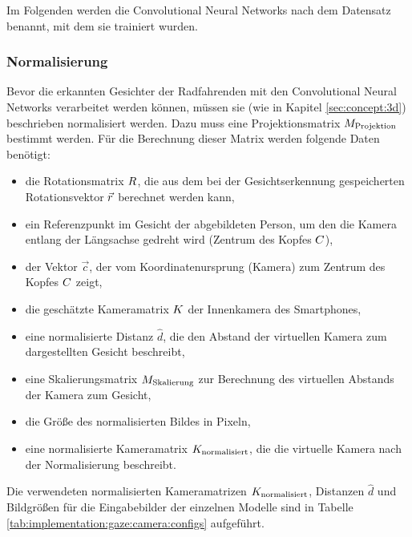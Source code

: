 Im Folgenden werden die Convolutional Neural Networks nach dem Datensatz benannt, mit dem sie trainiert wurden.

\subsubsection{Normalisierung}

Bevor die erkannten Gesichter der Radfahrenden mit den Convolutional Neural Networks verarbeitet werden können, müssen sie (wie in Kapitel \ref{sec:concept:3d}) beschrieben normalisiert werden. Dazu muss eine Projektionsmatrix $M_\text{Projektion}$ bestimmt werden. Für die Berechnung dieser Matrix werden folgende Daten benötigt:

\begin{itemize}
    \item die Rotationsmatrix $R$, die aus dem bei der Gesichtserkennung gespeicherten Rotationsvektor $\vec{r}$ berechnet werden kann,
    \item ein Referenzpunkt im Gesicht der abgebildeten Person, um den die Kamera entlang der Längsachse gedreht wird (Zentrum des Kopfes $C$),
    \item der Vektor $\vec{c}$, der vom Koordinatenursprung (Kamera) zum Zentrum des Kopfes $C$ zeigt,
    \item die geschätzte Kameramatrix $K$ der Innenkamera des Smartphones,
    \item eine normalisierte Distanz $\hat{d}$, die den Abstand der virtuellen Kamera zum dargestellten Gesicht beschreibt,
    \item eine Skalierungsmatrix $M_\text{Skalierung}$ zur Berechnung des virtuellen Abstands der Kamera zum Gesicht,
    \item die Größe des normalisierten Bildes in Pixeln,
    \item eine normalisierte Kameramatrix $K_{\text{normalisiert}}$, die die virtuelle Kamera nach der Normalisierung beschreibt.
\end{itemize}

Die verwendeten normalisierten Kameramatrizen $K_{\text{normalisiert}}$, Distanzen $\hat{d}$ und Bildgrößen für die Eingabebilder der einzelnen Modelle sind in Tabelle \ref{tab:implementation:gaze:camera:configs} aufgeführt.

